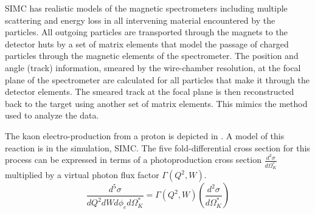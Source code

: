 
\label{Spectrometer Simulation}
SIMC has realistic models of the magnetic spectrometers including multiple scattering and energy loss in all intervening material encountered by the particles. All outgoing particles are transported through the magnets to the detector huts by a set of matrix elements that model the passage of charged particles through the magnetic elements of the spectrometer. The position and angle (track) information, smeared by the wire-chamber resolution, at the focal plane of the spectrometer are calculated for all particles that make it through the detector elements. The smeared track at the focal plane is then reconstructed back to the target using another set of matrix elements. This mimics the method used to analyze the data.

\label{Physics Model}
The kaon electro-production from a proton is depicted in . A model of this reaction is in the simulation, SIMC. The five fold-differential cross section for this process can be expressed in terms of a photoproduction cross section $\frac{d^2\sigma}{d\Omega_K^*}$ multiplied by a virtual photon flux factor $\Gamma(Q^2, W)$. 
\begin{equation} \label{equ:model1}
\frac{d^5\sigma}{dQ^2dWd\phi_{e}d\Omega^*_K} = \Gamma(Q^2,W) \left(\frac{d^2\sigma}{d\Omega^*_K}\right)
\end{equation}

